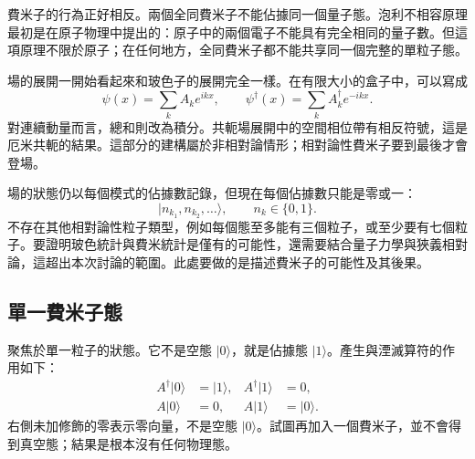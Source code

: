 費米子的行為正好相反。兩個全同費米子不能佔據同一個量子態。泡利不相容原理最初是在原子物理中提出的：原子中的兩個電子不能具有完全相同的量子數。但這項原理不限於原子；在任何地方，全同費米子都不能共享同一個完整的單粒子態。

場的展開一開始看起來和玻色子的展開完全一樣。在有限大小的盒子中，可以寫成
\begin{equation}
\psi(x)=\sum_k A_k e^{ikx},
\qquad
\psi^\dagger(x)=\sum_k A_k^\dagger e^{-ikx}.
\end{equation}
對連續動量而言，總和則改為積分。共軛場展開中的空間相位帶有相反符號，這是厄米共軛的結果。這部分的建構屬於非相對論情形；相對論性費米子要到最後才會登場。

場的狀態仍以每個模式的佔據數記錄，但現在每個佔據數只能是零或一：
\begin{equation}
|n_{k_1},n_{k_2},\ldots\rangle,
\qquad n_k\in\{0,1\}.
\end{equation}
不存在其他相對論性粒子類型，例如每個態至多能有三個粒子，或至少要有七個粒子。要證明玻色統計與費米統計是僅有的可能性，還需要結合量子力學與狹義相對論，這超出本次討論的範圍。此處要做的是描述費米子的可能性及其後果。

\subsection{單一費米子態}

聚焦於單一粒子的狀態。它不是空態 \(|0\rangle\)，就是佔據態 \(|1\rangle\)。產生與湮滅算符的作用如下：
\begin{align}
A^\dagger|0\rangle&=|1\rangle,
&
A^\dagger|1\rangle&=0,
\\
A|0\rangle&=0,
&
A|1\rangle&=|0\rangle.
\end{align}
右側未加修飾的零表示零向量，不是空態 \(|0\rangle\)。試圖再加入一個費米子，並不會得到真空態；結果是根本沒有任何物理態。

\begin{classroomqa}
\end{classroomqa}

\begin{classroomqa}
\end{classroomqa}

